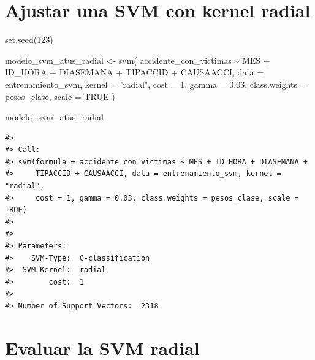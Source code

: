 \documentclass[
  spanish,
  10.5pt,
  letterpaper,
  openany,
  headings=big]{scrbook}
\newenvironment{Shaded}{}{}
\newcommand{\AttributeTok}[1]{\textcolor[rgb]{0.84,0.23,0.29}{#1}}
\newcommand{\ConstantTok}[1]{\textcolor[rgb]{0.00,0.36,0.77}{#1}}
\newcommand{\DecValTok}[1]{\textcolor[rgb]{0.00,0.36,0.77}{#1}}
\newcommand{\FloatTok}[1]{\textcolor[rgb]{0.00,0.36,0.77}{#1}}
\newcommand{\FunctionTok}[1]{\textcolor[rgb]{0.44,0.26,0.76}{#1}}
\newcommand{\NormalTok}[1]{\textcolor[rgb]{0.14,0.16,0.18}{#1}}
\newcommand{\OtherTok}[1]{\textcolor[rgb]{0.44,0.26,0.76}{#1}}
\newcommand{\SpecialCharTok}[1]{\textcolor[rgb]{0.00,0.36,0.77}{#1}}
\newcommand{\StringTok}[1]{\textcolor[rgb]{0.01,0.18,0.38}{#1}}
\begin{document}
\section{Ajustar una SVM con kernel
radial}\label{ajustar-una-svm-con-kernel-radial}

\begin{Shaded}
\begin{Highlighting}[]
\FunctionTok{set.seed}\NormalTok{(}\DecValTok{123}\NormalTok{)}

\NormalTok{modelo\_svm\_atus\_radial }\OtherTok{\textless{}{-}} \FunctionTok{svm}\NormalTok{(}
\NormalTok{  accidente\_con\_victimas }\SpecialCharTok{\textasciitilde{}}
\NormalTok{    MES }\SpecialCharTok{+}\NormalTok{ ID\_HORA }\SpecialCharTok{+}\NormalTok{ DIASEMANA }\SpecialCharTok{+}\NormalTok{ TIPACCID }\SpecialCharTok{+}\NormalTok{ CAUSAACCI,}
  \AttributeTok{data =}\NormalTok{ entrenamiento\_svm,}
  \AttributeTok{kernel =} \StringTok{"radial"}\NormalTok{,}
  \AttributeTok{cost =} \DecValTok{1}\NormalTok{,}
  \AttributeTok{gamma =} \FloatTok{0.03}\NormalTok{,}
  \AttributeTok{class.weights =}\NormalTok{ pesos\_clase,}
  \AttributeTok{scale =} \ConstantTok{TRUE}
\NormalTok{)}

\NormalTok{modelo\_svm\_atus\_radial}
\end{Highlighting}
\end{Shaded}

\begin{verbatim}
#> 
#> Call:
#> svm(formula = accidente_con_victimas ~ MES + ID_HORA + DIASEMANA + 
#>     TIPACCID + CAUSAACCI, data = entrenamiento_svm, kernel = "radial", 
#>     cost = 1, gamma = 0.03, class.weights = pesos_clase, scale = TRUE)
#> 
#> 
#> Parameters:
#>    SVM-Type:  C-classification 
#>  SVM-Kernel:  radial 
#>        cost:  1 
#> 
#> Number of Support Vectors:  2318
\end{verbatim}

\section{Evaluar la SVM radial}\label{evaluar-la-svm-radial}

\begin{Shaded}
\end{Shaded}
\end{document}
